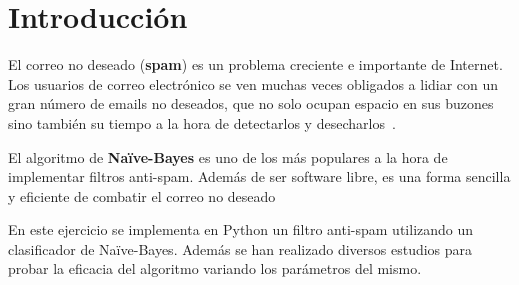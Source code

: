 \section{Introducción}

El correo no deseado (\textbf{spam}) es un problema creciente e importante de
Internet. Los usuarios de correo electrónico se ven muchas veces obligados a
lidiar con un gran número de emails no deseados, que no solo ocupan espacio en
sus buzones sino también su tiempo a la hora de detectarlos y
desecharlos~\cite{sahami1998bayesian}.

El algoritmo de \textbf{Naïve-Bayes} es uno de los más populares a la hora de
implementar filtros anti-spam. Además de ser software libre, es una forma
sencilla y eficiente de combatir el correo no
deseado~\cite{mendez2007sistemas}~\cite{metsis2006spam}

En este ejercicio se implementa en Python un filtro anti-spam utilizando un
clasificador de Naïve-Bayes. Además se han realizado diversos estudios para
probar la eficacia del algoritmo variando los parámetros del mismo.
